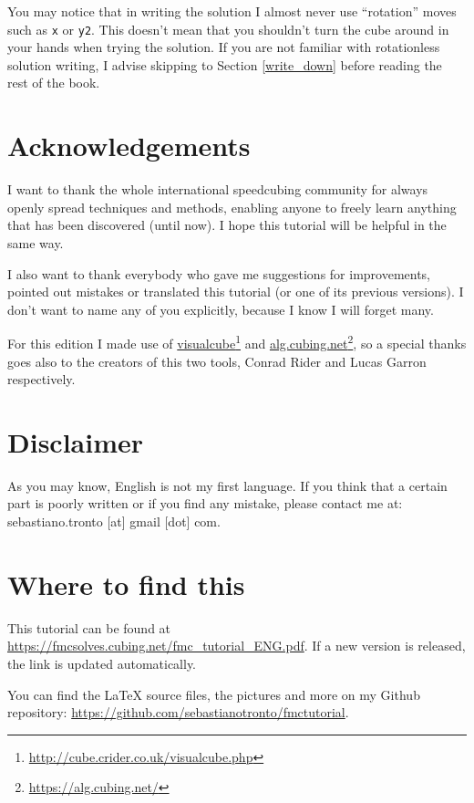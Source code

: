 \documentclass[11pt,a4paper]{book}
\newcommand{\m}{\texttt}
\begin{document}
You may notice that in writing the solution I almost never use ``rotation'' moves such as \m x or \m{y2}. This doesn't mean that you shouldn't turn the cube around in your hands when trying the solution. If you are not familiar with rotationless solution writing, I advise skipping to Section \ref{write_down} before reading the rest of the book.

\section*{Acknowledgements}

I want to thank the whole international speedcubing community for always openly spread techniques and methods, enabling anyone to freely learn anything that has been discovered (until now). I hope this tutorial will be helpful in the same way.

I also want to thank everybody who gave me suggestions for improvements, pointed out mistakes or translated this tutorial (or one of its previous versions). I don't want to name any of you explicitly, because I know I will forget many.

For this edition I made use of \href{http://cube.crider.co.uk/visualcube.php}{visualcube}\footnote{\url{http://cube.crider.co.uk/visualcube.php}%
} and \href{https://alg.cubing.net/}{alg.cubing.net}\footnote{\url{https://alg.cubing.net/}}, so a special thanks goes also to the creators of this two tools, Conrad Rider and Lucas Garron respectively.

\section*{Disclaimer}

As you may know, English is not my first language. If you think that a certain part is poorly written or if you find any mistake, please contact me at:
sebastiano.tronto [at] gmail [dot] com.

\section*{Where to find this}

This tutorial can be found at \url{https://fmcsolves.cubing.net/fmc_tutorial_ENG.pdf}. If a new version is released, the link is updated automatically.

You can find the LaTeX source files, the pictures and more on my Github repository: \url{https://github.com/sebastianotronto/fmctutorial}.
\end{document}
